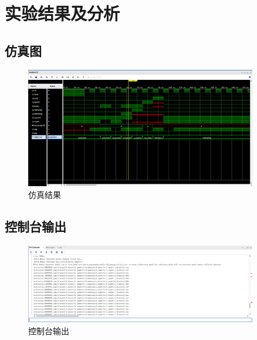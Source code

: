 \section{实验结果及分析}
\subsection{仿真图}
\begin{figure}[htbp]
    \centering
    \includegraphics[width=0.9\textwidth]{image/15.png}
    \caption{仿真结果}
    \label{fig:my_label}
\end{figure}
\subsection{控制台输出}
\begin{figure}[htbp]
    \centering
    \includegraphics[width=0.9\textwidth]{image/dw.png}
    \caption{控制台输出}
    \label{fig:my_label}
\end{figure}
